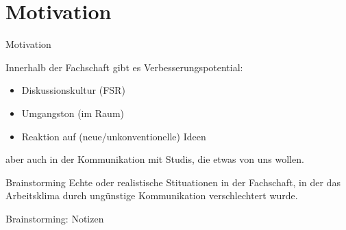 \section{Motivation}

\begin{frame}[c]{Motivation}

    Innerhalb der Fachschaft gibt es Verbesserungspotential: 
        
    \begin{itemize}[<+(1)->]
        \item Diskussionskultur (FSR)
        \item Umgangston (im Raum)
        \item Reaktion auf (neue/unkonventionelle) Ideen
    \end{itemize}
    \pause

    aber auch in der Kommunikation mit Studis, die etwas von uns wollen.

    \pause

    \begin{block}{Brainstorming}%
        Echte oder realistische Stituationen in der Fachschaft, in der das
        Arbeitsklima durch ungünstige Kommunikation verschlechtert wurde.
    \end{block}
\end{frame}


\begin{frame}[c]{Brainstorming: Notizen}
    
\end{frame}
